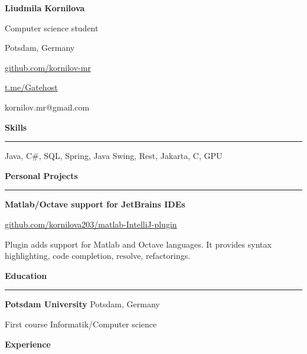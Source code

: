 \documentclass[9pt]{article}
\begin{document}
\begin{multicols}{2}

\noindent
\vspace{3em}
\noindent

{\huge{\textbf{Liudmila Kornilova}}}

Computer science student

Potsdam, Germany

\vspace{1em}

\href{https://github.com/kornilov-mr}{github.com/kornilov-mr}

\href{https://t.me/Gatehost}{t.me/Gatehost}

kornilov.mr@gmail.com

\vspace{5em}

{\textbf{Skills}}
\vspace{0.5em}
\hrule
\vspace{1em}

Java, C#, SQL, Spring, Java Swing, Rest, Jakarta, C, GPU


\vspace{2em}
{\textbf{Personal Projects}}
\vspace{0.5em}
\hrule
\vspace{1em}

{\textbf{Matlab/Octave support for JetBrains IDEs}}

\href{https://github.com/kornilova203/matlab-IntelliJ-plugin}{github.com/kornilova203/matlab-IntelliJ-plugin}

\vspace{0.3em}

Plugin adds support for Matlab and Octave languages. It provides syntax highlighting, code completion, resolve, refactorings.

\vspace{2em}
{\textbf{Education}}
\vspace{0.5em}
\hrule
\vspace{1em}

{\textbf{Potsdam University}} \color{gray} Potsdam, Germany \color{black}
\vspace{0.3em}

\color{gray} First course \color{black}
\color{gray} Informatik/Computer science \color{black}

\columnbreak

\vspace{0.5em}

{\textbf{Experience}}


\end{multicols}
\end{document}
